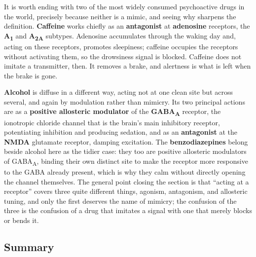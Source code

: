 \documentclass[11pt]{article}
\begin{document}
It is worth ending with two of the most widely consumed psychoactive drugs in the world, precisely because neither is a mimic, and seeing why sharpens the definition. \textbf{Caffeine} works chiefly as an \textbf{antagonist} at \textbf{adenosine} receptors, the \textbf{A\textsubscript{1}} and \textbf{A\textsubscript{2A}} subtypes. Adenosine accumulates through the waking day and, acting on these receptors, promotes sleepiness; caffeine occupies the receptors without activating them, so the drowsiness signal is blocked. Caffeine does not imitate a transmitter, then. It removes a brake, and alertness is what is left when the brake is gone.

\textbf{Alcohol} is diffuse in a different way, acting not at one clean site but across several, and again by modulation rather than mimicry. Its two principal actions are as a \textbf{positive allosteric modulator} of the \textbf{GABA\textsubscript{A}} receptor, the ionotropic chloride channel that is the brain's main inhibitory receptor, potentiating inhibition and producing sedation, and as an \textbf{antagonist} at the \textbf{NMDA} glutamate receptor, damping excitation. The \textbf{benzodiazepines} belong beside alcohol here as the tidier case: they too are positive allosteric modulators of GABA\textsubscript{A}, binding their own distinct site to make the receptor more responsive to the GABA already present, which is why they calm without directly opening the channel themselves. The general point closing the section is that ``acting at a receptor'' covers three quite different things, agonism, antagonism, and allosteric tuning, and only the first deserves the name of mimicry; the confusion of the three is the confusion of a drug that imitates a signal with one that merely blocks or bends it.

\subsection{Summary}
\end{document}
